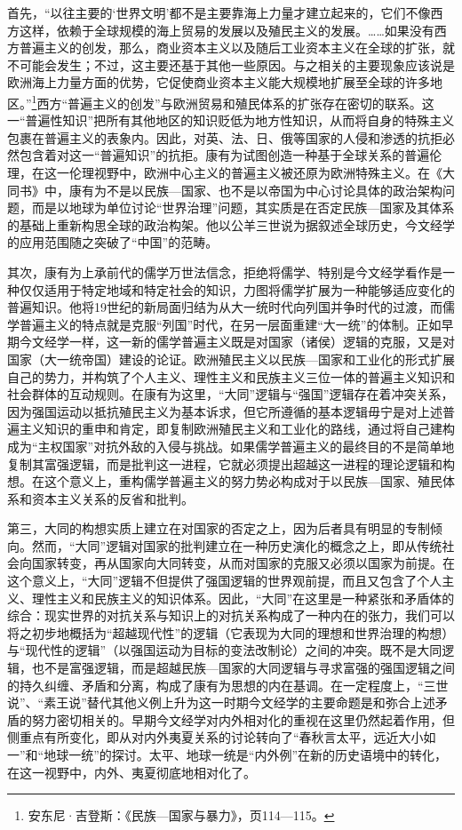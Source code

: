 \documentclass[a4paper, 12pt, openright]{ctexbook}
\begin{document}
首先，“以往主要的‘世界文明’都不是主要靠海上力量才建立起来的，它们不像西方这样，依赖于全球规模的海上贸易的发展以及殖民主义的发展。……如果没有西方普遍主义的创发，那么，商业资本主义以及随后工业资本主义在全球的扩张，就不可能会发生；不过，这主要还基于其他一些原因。与之相关的主要现象应该说是欧洲海上力量方面的优势，它促使商业资本主义能大规模地扩展至全球的许多地区。”\footnote{安东尼·吉登斯：《民族—国家与暴力》，页114—115。}西方“普遍主义的创发”与欧洲贸易和殖民体系的扩张存在密切的联系。这一“普遍性知识”把所有其他地区的知识贬低为地方性知识，从而将自身的特殊主义包裹在普遍主义的表象内。因此，对英、法、日、俄等国家的人侵和渗透的抗拒必然包含着对这一“普遍知识”的抗拒。康有为试图创造一种基于全球关系的普遍伦理，在这一伦理视野中，欧洲中心主义的普遍主义被还原为欧洲特殊主义。在《大同书》中，康有为不是以民族—国家、也不是以帝国为中心讨论具体的政治架构问题，而是以地球为单位讨论“世界治理”问题，其实质是在否定民族—国家及其体系的基础上重新构思全球的政治构架。他以公羊三世说为据叙述全球历史，今文经学的应用范围随之突破了“中国”的范畴。

其次，康有为上承前代的儒学万世法信念，拒绝将儒学、特别是今文经学看作是一种仅仅适用于特定地域和特定社会的知识，力图将儒学扩展为一种能够适应变化的普遍知识。他将19世纪的新局面归结为从大一统时代向列国并争时代的过渡，而儒学普遍主义的特点就是克服“列国”时代，在另一层面重建“大一统”的体制。正如早期今文经学一样，这一新的儒学普遍主义既是对国家（诸侯）逻辑的克服，又是对国家（大一统帝国）建设的论证。欧洲殖民主义以民族—国家和工业化的形式扩展自己的势力，并构筑了个人主义、理性主义和民族主义三位一体的普遍主义知识和社会群体的互动规则。在康有为这里，“大同”逻辑与“强国”逻辑存在着冲突关系，因为强国运动以抵抗殖民主义为基本诉求，但它所遵循的基本逻辑毋宁是对上述普遍主义知识的重申和肯定，即复制欧洲殖民主义和工业化的路线，通过将自己建构成为“主权国家”对抗外敌的入侵与挑战。如果儒学普遍主义的最终目的不是简单地复制其富强逻辑，而是批判这一进程，它就必须提出超越这一进程的理论逻辑和构想。在这个意义上，重构儒学普遍主义的努力势必构成对于以民族—国家、殖民体系和资本主义关系的反省和批判。

第三，大同的构想实质上建立在对国家的否定之上，因为后者具有明显的专制倾向。然而，“大同”逻辑对国家的批判建立在一种历史演化的概念之上，即从传统社会向国家转变，再从国家向大同转变，从而对国家的克服又必须以国家为前提。在这个意义上，“大同”逻辑不但提供了强国逻辑的世界观前提，而且又包含了个人主义、理性主义和民族主义的知识体系。因此，“大同”在这里是一种紧张和矛盾体的综合：现实世界的对抗关系与知识上的对抗关系构成了一种内在的张力，我们可以将之初步地概括为“超越现代性”的逻辑（它表现为大同的理想和世界治理的构想）与“现代性的逻辑”（以强国运动为目标的变法改制论）之间的冲突。既不是大同逻辑，也不是富强逻辑，而是超越民族—国家的大同逻辑与寻求富强的强国逻辑之间的持久纠缠、矛盾和分离，构成了康有为思想的内在基调。在一定程度上，“三世说”、“素王说”替代其他义例上升为这一时期今文经学的主要命题是和弥合上述矛盾的努力密切相关的。早期今文经学对内外相对化的重视在这里仍然起着作用，但侧重点有所变化，即从对内外夷夏关系的讨论转向了“春秋言太平，远近大小如一”和“地球一统”的探讨。太平、地球一统是“内外例”在新的历史语境中的转化，在这一视野中，内外、夷夏彻底地相对化了。
\end{document}
